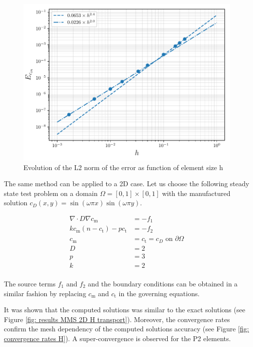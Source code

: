 \begin{figure}
    \centering
    \includegraphics[width=1\linewidth]{"Figures/Chapter3/L2 error on Cm vs h"}
    \caption{Evolution of the L2 norm of the error as function of element size h}
    \label{fig:error vs h}
\end{figure}

The same method can be applied to a 2D case.
Let us choose the following steady state test problem on a domain $\Omega = [0, 1] \times [0, 1]$ with the manufactured solution $c_D(x, y) = \sin(\omega \pi x) \sin(\omega \pi y)$.

\begin{align}
    \nabla \cdot D \nabla c_\mathrm{m} &= -f_1 \\
    k c_\mathrm{m} (n - c_\mathrm{t}) - p c_\mathrm{t} &= -f_2 \\
    c_\mathrm{m} &= c_\mathrm{t} = c_D \text{  on  } \partial \Omega \\
    D &= 2 \\
    p &= 3 \\
    k &= 2 \\
\end{align}

The source terms $f_1$ and $f_2$ and the boundary conditions can be obtained in a similar fashion by replacing $c_\mathrm{m}$ and $c_\mathrm{t}$ in the governing equations.

It was shown that the computed solutions was similar to the exact solutions (see Figure \ref{fig: results MMS 2D H transport}).
Moreover, the convergence rates confirm the mesh dependency of the computed solutions accuracy (see Figure \ref{fig: convergence rates H}).
A super-convergence is observed for the P2 elements.

